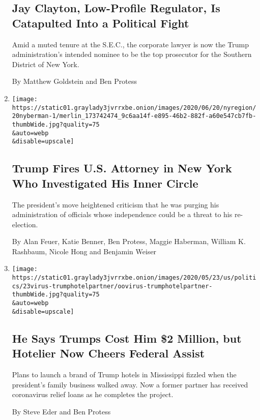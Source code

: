 \begin{enumerate}
  \hypertarget{jay-clayton-low-profile-regulator-is-catapulted-into-a-political-fight}{%
  \subsection{Jay Clayton, Low-Profile Regulator, Is Catapulted Into a
  Political
  Fight}\label{jay-clayton-low-profile-regulator-is-catapulted-into-a-political-fight}}

  Amid a muted tenure at the S.E.C., the corporate lawyer is now the
  Trump administration's intended nominee to be the top prosecutor for
  the Southern District of New York.

  By Matthew Goldstein and Ben Protess
\item
  \href{/2020/06/20/nyregion/trump-geoffrey-berman-fired-sdny.html}{}

  \texttt{[image: https://static01.graylady3jvrrxbe.onion/images/2020/06/20/nyregion/20nyberman-1/merlin\_173742474\_9c6aa14f-e895-46b2-882f-a60e547cb7fb-thumbWide.jpg?quality=75\\\&auto=webp\\\&disable=upscale]}

  \hypertarget{trump-fires-us-attorney-in-new-york-who-investigated-his-inner-circle}{%
  \subsection{Trump Fires U.S. Attorney in New York Who Investigated His
  Inner
  Circle}\label{trump-fires-us-attorney-in-new-york-who-investigated-his-inner-circle}}

  The president's move heightened criticism that he was purging his
  administration of officials whose independence could be a threat to
  his re-election.

  By Alan Feuer, Katie Benner, Ben Protess, Maggie Haberman, William K.
  Rashbaum, Nicole Hong and Benjamin Weiser
\item
  \href{/2020/05/22/us/hotel-coronavirus-trump.html}{}

  \texttt{[image: https://static01.graylady3jvrrxbe.onion/images/2020/05/23/us/politics/23virus-trumphotelpartner/oovirus-trumphotelpartner-thumbWide.jpg?quality=75\\\&auto=webp\\\&disable=upscale]}

  \hypertarget{he-says-trumps-cost-him-2-million-but-hotelier-now-cheers-federal-assist}{%
  \subsection{He Says Trumps Cost Him \$2 Million, but Hotelier Now
  Cheers Federal
  Assist}\label{he-says-trumps-cost-him-2-million-but-hotelier-now-cheers-federal-assist}}

  Plans to launch a brand of Trump hotels in Mississippi fizzled when
  the president's family business walked away. Now a former partner has
  received coronavirus relief loans as he completes the project.

  By Steve Eder and Ben Protess
\end{enumerate}


